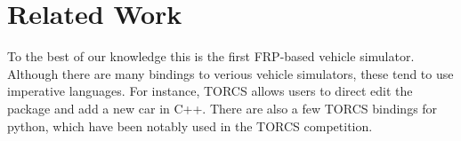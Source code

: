 \section{Related Work}

To the best of our knowledge this is the first FRP-based vehicle simulator.
Although there are many bindings to verious vehicle simulators, these tend to use imperative languages.
For instance, TORCS allows users to direct edit the package and add a new car in C++.
There are also a few TORCS bindings for python, which have been notably used in the TORCS competition.

